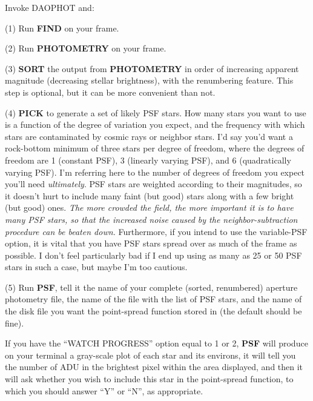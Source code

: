 \noindent Invoke DAOPHOT and:

\item{(1)} Run {\bf FIND} on your frame.

\item{(2)} Run {\bf PHOTOMETRY} on your frame.

\item{(3)} {\bf SORT} the output from {\bf PHOTOMETRY} in order of
increasing apparent magnitude (decreasing stellar brightness), with the
renumbering feature.  This step is optional, but it can be more
convenient than not.

\item{(4)} {\bf PICK} to generate a set of likely PSF stars.  How many
stars you want to use is a function of the degree of variation you
expect, and the frequency with which stars are contaminated by cosmic
rays or neighbor stars.  I'd say you'd want a rock-bottom minimum of
three stars per degree of freedom, where the degrees of freedom are 1
(constant PSF), 3 (linearly varying PSF), and 6 (quadratically varying
PSF).  I'm referring here to the number of degrees of freedom you
expect you'll need {\it ultimately\/}.  PSF stars are weighted
according to their magnitudes, so it doesn't hurt to include many faint
(but good) stars along with a few bright (but good) ones. {\it The more
crowded the field, the more important it is to have many PSF stars, so
that the increased noise caused by the neighbor-subtraction procedure
can be beaten down.} Furthermore, if you intend to use the variable-PSF
option, it is vital that you have PSF stars spread over as much of the
frame as possible.  I don't feel particularly bad if I end up using as
many as 25 or 50 PSF stars in such a case, but maybe I'm too cautious.

\item{(5)} Run {\bf PSF}, tell it the name of your complete (sorted,
renumbered) aperture photometry file, the name of the file with the
list of PSF stars, and the name of the disk file you want the
point-spread function stored in (the default should be fine).

 If you have the ``WATCH PROGRESS'' option equal to 1 or
2, {\bf PSF} will produce on your terminal a gray-scale plot of each
star and its environs, it will tell you the number of ADU in the
brightest pixel within the area displayed, and then it will
ask whether you wish to include this star in the point-spread
function, to which you should answer ``Y'' or ``N'', as appropriate.

